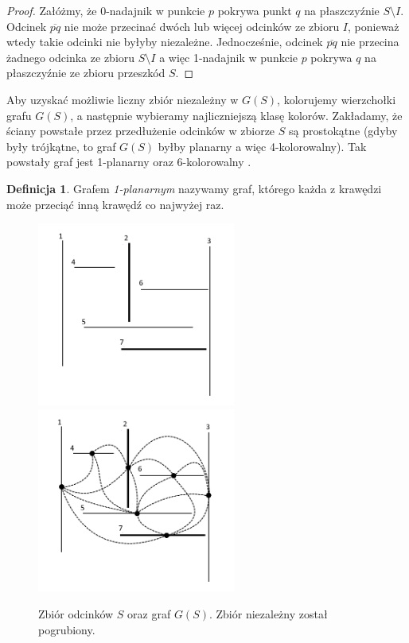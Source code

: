 \documentclass[brudnopis]{xmgr}
\theoremstyle{definition}
\newtheorem{Definicja}{Definicja}
\begin{document}
\begin{proof}
  \indent Załóżmy, że 0-nadajnik w punkcie $p$ pokrywa punkt $q$ na płaszczyźnie $S \setminus I$. Odcinek $\overline{pq}$ nie może przecinać dwóch lub więcej odcinków ze zbioru $I$, ponieważ wtedy takie odcinki nie byłyby niezależne. Jednocześnie, odcinek $\overline{pq}$ nie przecina żadnego odcinka ze zbioru $S \setminus I$ a więc 1-nadajnik w punkcie $p$ pokrywa $q$ na płaszczyźnie ze zbioru przeszkód $S$.
\end{proof}

\indent Aby uzyskać możliwie liczny zbiór niezależny w $G(S)$, kolorujemy wierzchołki grafu $G(S)$, a następnie wybieramy najliczniejszą klasę kolorów. Zakładamy, że ściany powstałe przez przedłużenie odcinków w zbiorze $S$ są prostokątne (gdyby były trójkątne, to graf $G(S)$ byłby planarny a więc 4-kolorowalny). 
Tak powstały graf jest 1-planarny oraz 6-kolorowalny \cite{borodin}.

\begin{Definicja}
  Grafem \emph{1-planarnym} nazywamy graf, którego każda z krawędzi może przeciąć inną krawędź co najwyżej raz.
\end{Definicja}
\begin{figure}[ht!]
  \centering
  \includegraphics[width=6.5cm]{rysunki/zbior_odcinkow.png}
  \includegraphics[width=6.5cm]{rysunki/graf_zbioru_odcinkow.png}
  \caption{Zbiór odcinków $S$ oraz graf $G(S)$. Zbiór niezależny został pogrubiony.}
  \label{fig:przedluzone odcinki}
\end{figure} 
\end{document}
